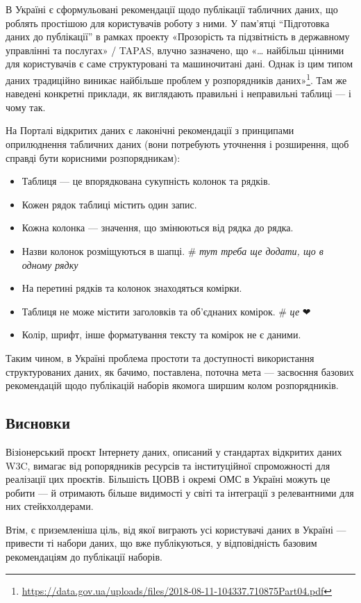 \documentclass[
]{agujournal2019}
\providecommand{\tightlist}{%
  \setlength{\itemsep}{0pt}\setlength{\parskip}{0pt}}\usepackage{longtable,booktabs,array}
\begin{document}
В Україні є сформульовані рекомендації щодо публікації табличних даних,
що роблять простішою для користувачів роботу з ними. У пам'ятці
``Підготовка даних до публікації'' в рамках проекту «Прозорість та
підзвітність в державному управлінні та послугах» / TAPAS, влучно
зазначено, що «\ldots{} найбільш цінними для користувачів є саме
структуровані та машиночитані дані. Однак із цим типом даних традиційно
виникає найбільше проблем у розпорядників даних»\footnote{\url{https://data.gov.ua/uploads/files/2018-08-11-104337.710875Part04.pdf}}.
Там же наведені конкретні приклади, як виглядають правильні і
неправильні таблиці --- і чому так.

На Порталі відкритих даних є лаконічні рекомендації з принципами
оприлюднення табличних даних (вони потребують уточнення і розширення,
щоб справді бути корисними розпорядникам):

\begin{itemize}
\tightlist
\item
  Таблиця --- це впорядкована сукупність колонок та рядків.
\item
  Кожен рядок таблиці містить один запис.
\item
  Кожна колонка --- значення, що змінюються від рядка до рядка.
\item
  Назви колонок розміщуються в шапці. \# \emph{тут треба ще додати, що в
  одному рядку}
\item
  На перетині рядків та колонок знаходяться комірки.
\item
  Таблиця не може містити заголовків та об'єднаних комірок. \# \emph{це}
  ❤
\item
  Колір, шрифт, інше форматування тексту та комірок не є даними.
\end{itemize}

Таким чином, в Україні проблема простоти та доступності використання
структурованих даних, як бачимо, поставлена, поточна мета --- засвоєння
базових рекомендацій щодо публікацій наборів якомога ширшим колом
розпорядників.

\subsection{Висновки}\label{ux432ux438ux441ux43dux43eux432ux43aux438}

Візіонерський проєкт Інтернету даних, описаний у стандартах відкритих
даних W3C, вимагає від ропорядників ресурсів та інституційної
спроможності для реалізації цих проєктів. Більшість ЦОВВ і окремі ОМС в
Україні можуть це робити --- й отримають більше видимості у світі та
інтеграції з релевантними для них стейкхолдерами.

Втім, є приземленіша ціль, від якої виграють усі користувачі даних в
Україні --- привести ті набори даних, що вже публікуються, у
відповідність базовим рекомендаціям до публікації наборів.
\end{document}
